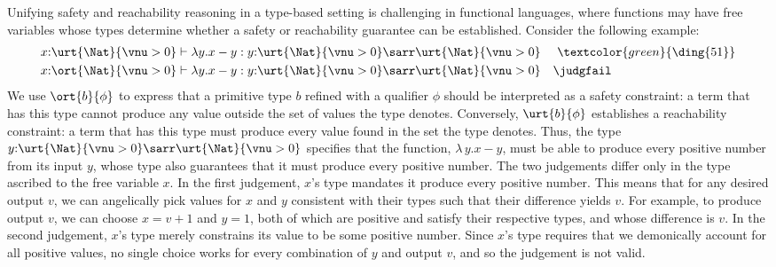 Unifying safety and reachability reasoning in a type-based setting
is challenging in functional languages, where functions may have
free variables whose types determine whether a safety or reachability
guarantee can be established.  Consider the following example:
\begin{align*}
    &x{:}\urt{\Nat}{\vnu > 0} \vdash \lambda y.x - y : y{:}\urt{\Nat}{\vnu > 0} \sarr \urt{\Nat}{\vnu > 0} \quad\ \textcolor{green}{\text{\ding{51}}}
    \\&x{:}\ort{\Nat}{\vnu > 0} \vdash \lambda y.x - y : y{:}\urt{\Nat}{\vnu > 0} \sarr \urt{\Nat}{\vnu > 0} \quad\judgfail
\end{align*}\noindent
We use $\ort{b}{\phi}$ to express that a primitive type $b$ refined
with a qualifier $\phi$ should be interpreted as a safety constraint:
a term that has this type cannot produce any value outside the set of
values the type denotes.  Conversely, $\urt{b}{\phi}$ establishes a
reachability constraint: a term that has this type must produce every
value found in the set the type denotes.  Thus, the type
$y{:}\urt{\Nat}{\vnu > 0} \sarr \urt{\Nat}{\vnu > 0}$ specifies that
the function, $\lambda\, y. x - y$, must be able to produce every
positive number from its input $y$, whose type also guarantees that it
must produce every positive number.  The two judgements differ only in
the type ascribed to the free variable $x$.  In the first judgement,
$x$'s type mandates it produce every positive number.  This means that
for any desired output $v$, we can angelically pick values for $x$ and
$y$ consistent with their types such that their difference yields $v$.
For example, to produce output $v$, we can choose $x = v + 1$ and $y =
1$, both of which are positive and satisfy their respective types, and
whose difference is $v$.  In the second judgement, $x$'s type merely
constrains its value to be some positive number.  Since $x$'s type
requires that we demonically account for all positive values, no
single choice works for every combination of $y$ and output $v$, and
so the judgement is not valid.

